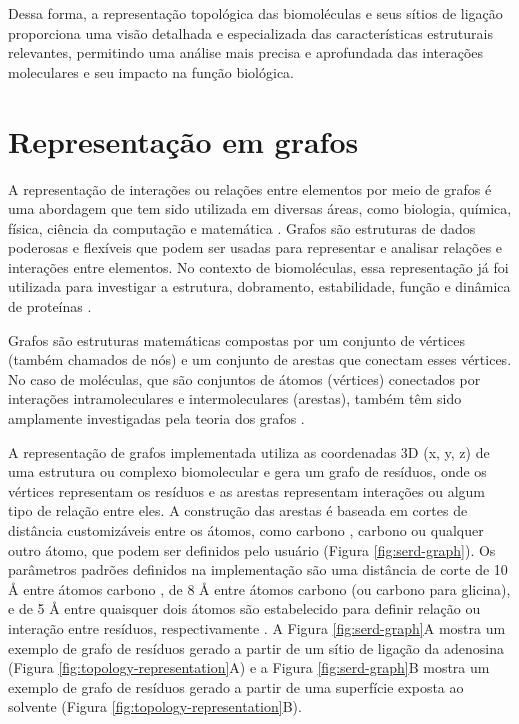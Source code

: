 \documentclass[Portugues]{phdquali}
\begin{document}
Dessa forma, a representação topológica das biomoléculas e seus sítios de ligação proporciona uma visão detalhada e especializada das características estruturais relevantes, permitindo uma análise mais precisa e aprofundada das interações moleculares e seu impacto na função biológica.

\section{Representação em grafos \label{sec:graph-representation}}


A representação de interações ou relações entre elementos por meio de grafos é uma abordagem que tem sido utilizada em diversas áreas, como biologia, química, física, ciência da computação e matemática \cite{foulds1995,majeed2020}. Grafos são estruturas de dados poderosas e flexíveis que podem ser usadas para representar e analisar relações e interações entre elementos. No contexto de biomoléculas, essa representação já foi utilizada para investigar a estrutura, dobramento, estabilidade, função e dinâmica de proteínas \cite{vishveshwara2002}.

Grafos são estruturas matemáticas compostas por um conjunto de vértices (também chamados de nós) e um conjunto de arestas que conectam esses vértices. No caso de moléculas, que são conjuntos de átomos (vértices) conectados por interações intramoleculares e intermoleculares (arestas), também têm sido amplamente investigadas pela teoria dos grafos \cite{vishveshwara2002,mason2007}.

A representação de grafos implementada utiliza as coordenadas 3D (x, y, z) de uma estrutura ou complexo biomolecular e gera um grafo de resíduos, onde os vértices representam os resíduos e as arestas representam interações ou algum tipo de relação entre eles. A construção das arestas é baseada em cortes de distância customizáveis entre os átomos, como carbono \textalpha, carbono \textbeta\space ou qualquer outro átomo, que podem ser definidos pelo usuário (Figura \ref{fig:serd-graph}). Os parâmetros padrões definidos na implementação são uma distância de corte de 10 Å entre átomos carbono \textalpha, de 8 Å entre átomos carbono \textbeta\space (ou carbono \textalpha\space para glicina), e de 5 Å entre quaisquer dois átomos são estabelecido para definir relação ou interação entre resíduos, respectivamente \cite{vishveshwara2002,mason2007}. A Figura \ref{fig:serd-graph}A mostra um exemplo de grafo de resíduos gerado a partir de um sítio de ligação da adenosina (Figura \ref{fig:topology-representation}A) e a Figura \ref{fig:serd-graph}B mostra um exemplo de grafo de resíduos gerado a partir de uma superfície exposta ao solvente (Figura \ref{fig:topology-representation}B).
\end{document}
